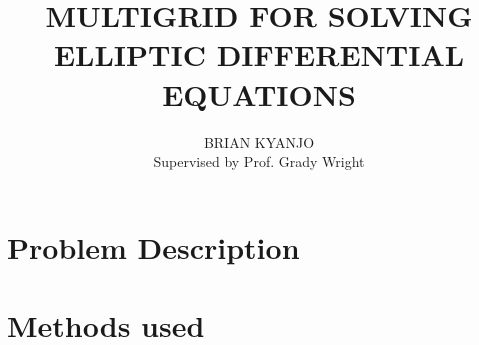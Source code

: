 \documentclass[10pt,a4paper]{article}
\author{BRIAN KYANJO \\Supervised by Prof. Grady Wright}
\title{MULTIGRID FOR SOLVING ELLIPTIC DIFFERENTIAL EQUATIONS}
\begin{document}
	\maketitle
	
	\newpage
	
	
	\section*{Problem Description}
	
	
	  
	\section*{Methods used}
	
	
	
	
\end{document}
